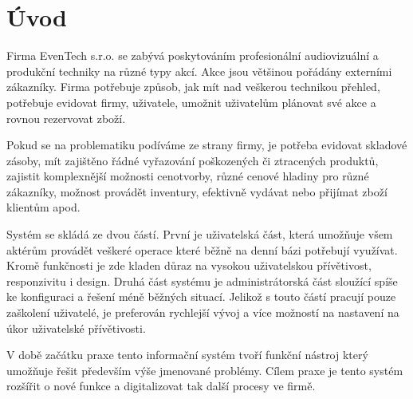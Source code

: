 \chapter{Úvod}
\label{sec:Introduction}

Firma EvenTech s.r.o. se  zabývá poskytováním profesionální audiovizuální a produkční techniky na různé typy akcí. Akce jsou většinou pořádány externími zákazníky. Firma potřebuje způsob, jak mít nad veškerou technikou přehled, potřebuje evidovat firmy, uživatele, umožnit uživatelům plánovat své akce a rovnou rezervovat zboží.

Pokud se na problematiku podíváme ze strany firmy, je  potřeba evidovat skladové zásoby, mít zajištěno řádné vyřazování poškozených či ztracených produktů, zajistit komplexnější možnosti cenotvorby, různé cenové hladiny pro různé zákazníky, možnost provádět inventury, efektivně vydávat nebo přijímat zboží klientům apod.

Systém se skládá ze dvou částí. První je uživatelská část, která umožňuje všem aktérům provádět veškeré operace které běžně na denní bázi potřebují využívat. Kromě funkčnosti je zde kladen důraz na vysokou uživatelskou přívětivost, responzivitu i design. Druhá část systému je administrátorská část sloužící spíše ke konfiguraci a řešení méně běžných situací. Jelikož s touto částí pracují pouze zaškolení uživatelé, je preferován rychlejší vývoj a více možností na nastavení na úkor uživatelské přívětivosti. 

V době začátku praxe tento informační systém tvoří funkční nástroj který umožňuje řešit především výše jmenované problémy. Cílem praxe je tento systém rozšířit o nové funkce a digitalizovat tak další procesy ve firmě.